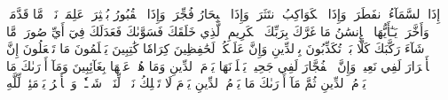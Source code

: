 إِذَا ٱلسَّمَآءُ ٱنفَطَرَتۡ
وَإِذَا ٱلۡكَوَاكِبُ ٱنتَثَرَتۡ
وَإِذَا ٱلۡبِحَارُ فُجِّرَتۡ
وَإِذَا ٱلۡقُبُورُ بُعۡثِرَتۡ
عَلِمَتۡ نَفۡسٞ مَّا قَدَّمَتۡ وَأَخَّرَتۡ
يَـٰٓأَيُّهَا ٱلۡإِنسَٰنُ مَا غَرَّكَ بِرَبِّكَ ٱلۡكَرِيمِ
ٱلَّذِي خَلَقَكَ فَسَوَّىٰكَ فَعَدَلَكَ
فِيٓ أَيِّ صُورَةٖ مَّا شَآءَ رَكَّبَكَ
كَلَّا بَلۡ تُكَذِّبُونَ بِٱلدِّينِ
وَإِنَّ عَلَيۡكُمۡ لَحَٰفِظِينَ
كِرَامٗا كَٰتِبِينَ
يَعۡلَمُونَ مَا تَفۡعَلُونَ
إِنَّ ٱلۡأَبۡرَارَ لَفِي نَعِيمٖ
وَإِنَّ ٱلۡفُجَّارَ لَفِي جَحِيمٖ
يَصۡلَوۡنَهَا يَوۡمَ ٱلدِّينِ
وَمَا هُمۡ عَنۡهَا بِغَآئِبِينَ
وَمَآ أَدۡرَىٰكَ مَا يَوۡمُ ٱلدِّينِ
ثُمَّ مَآ أَدۡرَىٰكَ مَا يَوۡمُ ٱلدِّينِ
يَوۡمَ لَا تَمۡلِكُ نَفۡسٞ لِّنَفۡسٖ شَيۡـٔٗاۖ وَٱلۡأَمۡرُ يَوۡمَئِذٖ لِّلَّهِ